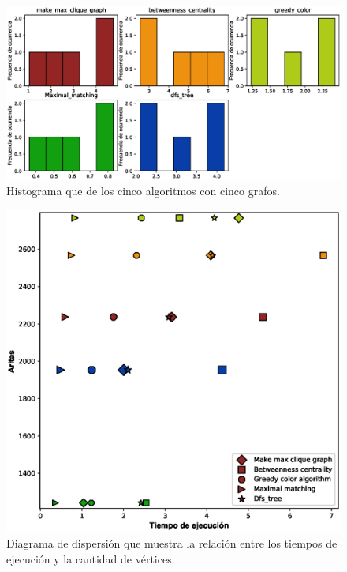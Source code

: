 \documentclass{article}
\begin{document}
\begin{figure}[h]
\includegraphics[scale=0.6]{Histograma.eps}
\caption{Histograma que de los cinco algoritmos con cinco grafos.}
\end{figure}
\begin{figure}[h]
\includegraphics[scale=0.6]{DiagramAristas.eps}
\caption{Diagrama de dispersión que muestra la relación entre los tiempos de ejecución y la cantidad de vértices.}
\end{figure}
\end{document}
